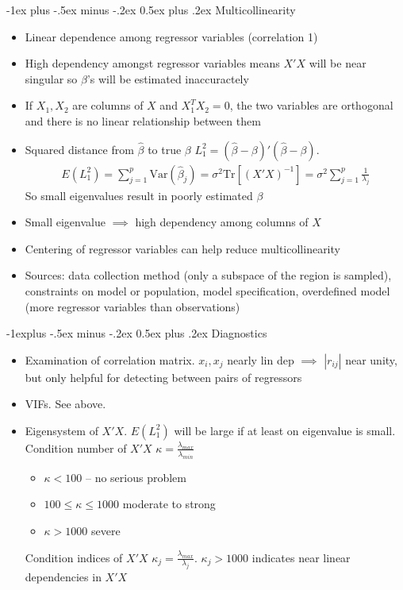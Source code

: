 \documentclass[frenchspacing,9pt,landscape,a4paper]{article}
\makeatletter
\renewcommand{\section}{\@startsection{section}{1}{0mm}%
                                {-1ex plus -.5ex minus -.2ex}%
                                {0.5ex plus .2ex}%
                                {\normalfont\large\bfseries}}
\renewcommand{\subsection}{\@startsection{subsection}{2}{0mm}%
                                {-1explus -.5ex minus -.2ex}%
                                {0.5ex plus .2ex}%
                                {\normalfont\normalsize\bfseries}}
\newcommand{\abs}[1]{\left\lvert #1 \right\rvert}
\makeatother
\begin{document}
\begin{multicols}{3}
\section{Multicollinearity}
\begin{itemize}
	\item Linear dependence among regressor variables (correlation 1)
	\item High dependency amongst regressor variables means $X'X$ will be near singular so  $\beta$'s will be estimated inaccuractely
	\item If  $X_1,X_2$ are columns of $X$ and  $X_1^TX_2=0$, the two variables are orthogonal and there is no linear relationship between them
	\item Squared distance from $\hat{\beta}$ to true  $\beta$  $L_1^2=(\hat{\beta}-\beta)'(\hat{\beta}-\beta)$.
		\begin{align*}
			E(L_1^2)=\sum_{j=1}^p\text{Var}(\hat{\beta}_j)=\sigma^2\text{Tr}[(X'X)^{-1}]=\sigma^2\sum_{j=1}^p\frac{1}{\lambda_j}
		\end{align*} So small eigenvalues result in poorly estimated $\beta$ 
	\item Small eigenvalue $\implies$ high dependency among columns of  $X$
	\item Centering of regressor variables can help reduce multicollinearity
	\item Sources: data collection method (only a subspace of the region is sampled), constraints on model or population, model specification, overdefined model (more regressor variables than observations)
\end{itemize}
\subsection{Diagnostics}
\begin{itemize}
	\item Examination of correlation matrix. $x_i,x_j$ nearly lin dep  $\implies$  $\abs{r_{ij}}$ near unity, but only helpful for detecting between pairs of regressors
	\item VIFs. See above.
	\item Eigensystem of  $X'X$.  $E(L_1^2)$ will be large if at least on eigenvalue is small. Condition number of $X'X$  $\kappa=\frac{\lambda_{max}}{\lambda_{min}}$
		\begin{itemize}
			\item $\kappa<100$ -- no serious problem
			\item  $100\leq\kappa\leq 1000$ moderate to strong
			\item  $\kappa>1000$ severe
		\end{itemize} Condition indices of $X'X$  $\kappa_j=\frac{\lambda_{max}}{\lambda_j}$. $\kappa_j>1000$ indicates near linear dependencies in  $X'X$
\end{itemize}

\end{multicols}
\end{document}
